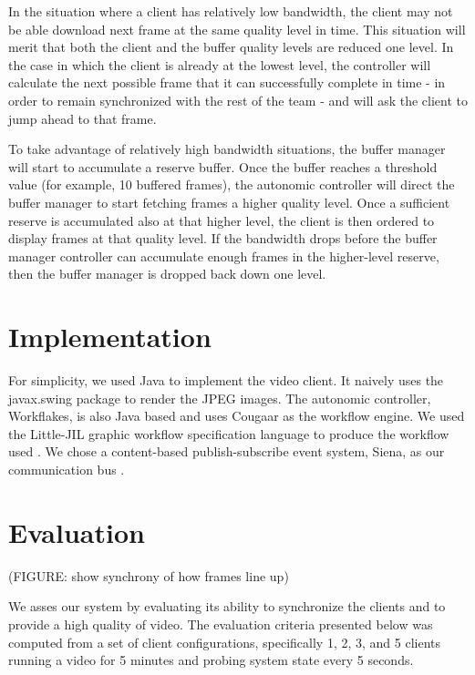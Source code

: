 \documentclass{sig-alternate}
\begin{document}
In the situation where a client has relatively low bandwidth, the
client may not be able download next frame at the same quality level
in time.  This situation will merit that both the client and the
buffer quality levels are reduced one level. In the case in which the
client is already at the lowest level, the controller will calculate
the next possible frame that it can successfully complete in time - in
order to remain synchronized with the rest of the team - and will ask
the client to jump ahead to that frame.

To take advantage of relatively high bandwidth situations, the buffer
manager will start to accumulate a reserve buffer.  Once the buffer
reaches a threshold value (for example, 10 buffered frames), the
autonomic controller will direct the buffer manager to start fetching
frames a higher quality level.  Once a sufficient reserve is
accumulated also at that higher level, the client is then ordered to
display frames at that quality level.  If the bandwidth drops before
the buffer manager controller can accumulate enough frames in the
higher-level reserve, then the buffer manager is dropped back down one
level.

\section{Implementation} \label{implementation}

For simplicity, we used Java to implement the video client.  It
naively uses the javax.swing package to render the JPEG images.  The
autonomic controller, Workflakes, is also Java based and uses Cougaar
\cite{Cougaar} as the workflow engine.  We used the Little-JIL graphic
workflow specification language to produce the workflow used
\cite{L-JIL}.  We chose a content-based publish-subscribe event
system, Siena, as our communication bus \cite{SIENA}.

\section{Evaluation} \label{eval}

(FIGURE: show synchrony of how frames line up)

We asses our system by evaluating its ability to synchronize the
clients and to provide a high quality of video.  The evaluation
criteria presented below was computed from a set of client
configurations, specifically 1, 2, 3, and 5 clients running a video
for 5 minutes and probing system state every 5 seconds.
\end{document}
